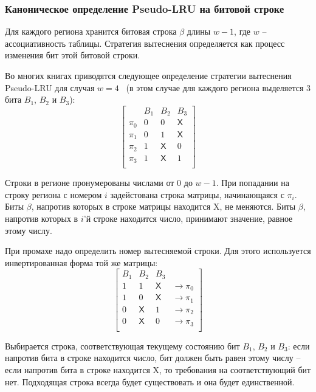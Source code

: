 \documentclass[14pt]{extreport}
\newcommand{\PseudoLRU}{\textsf{Pseudo-LRU}\xspace}
\begin{document}
\subsubsection{Каноническое определение \PseudoLRU на битовой строке}

Для каждого региона хранится битовая строка $\beta$ длины $w-1$, где $w$ --
ассоциативность таблицы. Стратегия вытеснения определяется как процесс изменения
бит этой битовой строки.

Во многих книгах приводятся следующее определение стратегии
вытеснения \PseudoLRU для случая
$w=4$~\cite{FundamentalOfComputerOrganizationAndDesign} (в этом
случае для каждого региона выделяется 3 бита $B_1$, $B_2$ и $B_3$):
$$ \left[
  \begin{array}{c|ccc}
          & B_1 & B_2 & B_3 \\ \hline
    \pi_0 & 0 & 0 & \textsf{X} \\
    \pi_1 & 0 & 1 & \textsf{X} \\
    \pi_2 & 1 & \textsf{X} & 0 \\
    \pi_3 & 1 & \textsf{X} & 1 \\
  \end{array}
\right]
$$

Строки в регионе пронумерованы числами от 0 до $w-1$. При попадании на строку
региона с номером $i$ задейстована строка матрицы, начинающаяся с $\pi_i$. Биты
$\beta$, напротив которых в строке матрицы находится \textsf{X}, не меняются.
Биты $\beta$, напротив которых в $i$'й строке находится число, принимают
значение, равное этому числу.

При промахе надо определить номер вытесняемой строки. Для этого используется
инвертированная форма той же матрицы:
$$
\left[
  \begin{array}{ccc|c}
    B_1 & B_2 & B_3 & \\ \hline
    1 & 1 & \textsf{X} & \rightarrow \pi_0 \\
    1 & 0 & \textsf{X} & \rightarrow \pi_1 \\
    0 & \textsf{X} & 1 & \rightarrow \pi_2 \\
    0 & \textsf{X} & 0 & \rightarrow \pi_3 \\
  \end{array}
\right]
$$

Выбирается строка, соответствующая текущему состоянию бит $B_1$,
$B_2$ и $B_3$: если напротив бита в строке находится число, бит
должен быть равен этому числу -- если напротив бита в строке
находится \textsf{X}, то требования на соответствующий бит нет.
Подходящая строка всегда будет существовать и она будет
единственной.
\end{document}
